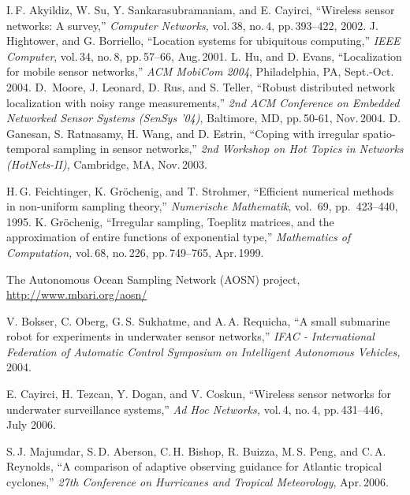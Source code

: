 \documentclass[final, a4paper]{IEEEtran}
\begin{document}
\begin{thebibliography}{99}
 I.\,F. Akyildiz, W. Su, Y. Sankarasubramaniam, and E. Cayirci,
``Wireless sensor networks: A survey,'' {\em Computer Networks,} vol.\,38, no.\,4,
pp.\,393--422, 2002.
J. Hightower, and G. Borriello,
``Location systems for ubiquitous computing,''
{\em IEEE Computer}, vol.\,34, no.\,8, pp.\,57--66,
Aug.\,2001.
L. Hu, and D. Evans,
``Localization for mobile sensor networks,''
{\em
ACM MobiCom 2004}, Philadelphia, PA, Sept.-Oct.\,2004.
D.~Moore, J. Leonard, D. Rus, and S. Teller,
``Robust distributed network localization with noisy range measurements,''
{\em 2nd ACM Conference on Embedded Networked Sensor Systems
(SenSys '04)}, Baltimore, MD, pp.\,50-61, Nov.\,2004.
 D. Ganesan, S. Ratnasamy, H. Wang, and D. Estrin,
``Coping with irregular spatio-temporal sampling in sensor networks,''
{\em 2nd Workshop on Hot Topics in Networks (HotNets-II)}, Cambridge,
MA, Nov.\,2003.

H.\,G. Feichtinger, K. Gr\"ochenig, and T. Strohmer,
``Efficient numerical methods in non-uniform sampling theory,''
{\em Numerische Mathematik}, vol.\ 69, pp.\ 423--440, 1995.
 K. Gr\"{o}chenig,
 ``Irregular sampling, Toeplitz matrices, and the approximation of entire
functions of exponential type,'' {\em Mathematics of Computation,}
vol.\,68, no.\,226, pp.\,749--765, Apr.\,1999.


 The  Autonomous Ocean Sampling Network (AOSN) project,
\url{http://www.mbari.org/aosn/}

 V. Bokser, C. Oberg, G.\,S. Sukhatme, and A.\,A.
Requicha, ``A small submarine robot for experiments in underwater sensor
networks,'' {\em IFAC - International Federation of Automatic Control
Symposium on Intelligent Autonomous Vehicles,} 2004.

 E. Cayirci, H. Tezcan, Y. Dogan, and V. Coskun,
``Wireless sensor networks for underwater surveillance systems,''
{\em Ad Hoc Networks,} vol.\,4, no.\,4, pp.\,431--446, July 2006.

S.\,J. Majumdar, S.\,D. Aberson, C.\,H. Bishop, R. Buizza, M.\,S. Peng, and C.\,A. Reynolds,
``A comparison of adaptive observing guidance for Atlantic tropical cyclones,'' {\em
27th Conference on Hurricanes and Tropical Meteorology}, Apr.\,2006.



\end{thebibliography}
\end{document}
